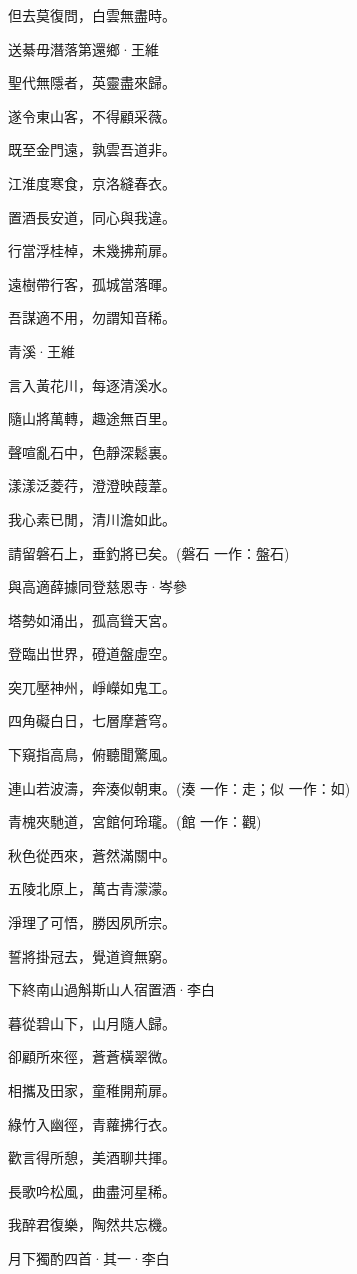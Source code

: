 \documentclass[12pt,a4paper]{ctexbook}
\begin{document}
但去莫復問，白雲無盡時。\par
送綦毋潛落第還鄉·王維\par
聖代無隱者，英靈盡來歸。\par
遂令東山客，不得顧采薇。\par
既至金門遠，孰雲吾道非。\par
江淮度寒食，京洛縫春衣。\par
置酒長安道，同心與我違。\par
行當浮桂棹，未幾拂荊扉。\par
遠樹帶行客，孤城當落暉。\par
吾謀適不用，勿謂知音稀。\par
青溪·王維\par
言入黃花川，每逐清溪水。\par
隨山將萬轉，趣途無百里。\par
聲喧亂石中，色靜深鬆裏。\par
漾漾泛菱荇，澄澄映葭葦。\par
我心素已閒，清川澹如此。\par
請留磐石上，垂釣將已矣。(磐石 一作：盤石)\par
與高適薛據同登慈恩寺·岑參\par
塔勢如涌出，孤高聳天宮。\par
登臨出世界，磴道盤虛空。\par
突兀壓神州，崢嶸如鬼工。\par
四角礙白日，七層摩蒼穹。\par
下窺指高鳥，俯聽聞驚風。\par
連山若波濤，奔湊似朝東。(湊 一作：走；似 一作：如)\par
青槐夾馳道，宮館何玲瓏。(館 一作：觀)\par
秋色從西來，蒼然滿關中。\par
五陵北原上，萬古青濛濛。\par
淨理了可悟，勝因夙所宗。\par
誓將掛冠去，覺道資無窮。\par
下終南山過斛斯山人宿置酒·李白\par
暮從碧山下，山月隨人歸。\par
卻顧所來徑，蒼蒼橫翠微。\par
相攜及田家，童稚開荊扉。\par
綠竹入幽徑，青蘿拂行衣。\par
歡言得所憩，美酒聊共揮。\par
長歌吟松風，曲盡河星稀。\par
我醉君復樂，陶然共忘機。\par
月下獨酌四首·其一·李白\par
\end{document}
